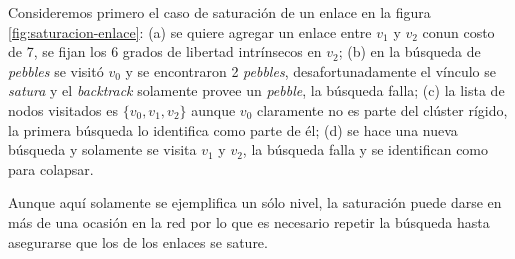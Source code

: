 Consideremos primero el caso de saturación de un enlace en la figura \ref{fig:saturacion-enlace}: (a) se quiere agregar un enlace entre $v_1$ y $v_2$ conun costo de 7, se fijan los 6 grados de libertad intrínsecos en $v_2$; (b) en la búsqueda de \emph{pebbles} se visitó $v_0$ y se encontraron 2 \emph{pebbles}, desafortunadamente el vínculo se \emph{satura} y el \emph{backtrack} solamente provee un \emph{pebble}, la búsqueda falla; (c) la lista de nodos visitados es $\{v_0, v_1, v_2\}$ aunque $v_0$ claramente no es parte del clúster rígido, la primera búsqueda lo identifica como parte de él; (d) se hace una nueva búsqueda y solamente se visita $v_1$ y $v_2$, la búsqueda falla y se identifican como para colapsar.

Aunque aquí solamente se ejemplifica un sólo nivel, la saturación puede darse en más de una ocasión en la red por lo que es necesario repetir la búsqueda hasta asegurarse que los de los enlaces se sature.

